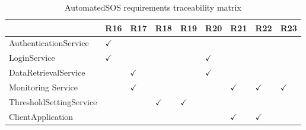 \begin{table}
\begin{adjustwidth}{-4cm}{}
\captionsetup{justification=centering}
\caption{AutomatedSOS requirements traceability matrix}
  \label{tab:table2}
\begin{tabular}{|l||l|l|l|l|l|l|l|l|}
\hline
\cellcolor[HTML]{EFEFEF}                      & \cellcolor[HTML]{EFEFEF} R16 & \cellcolor[HTML]{EFEFEF} R17 & \cellcolor[HTML]{EFEFEF} R18 & \cellcolor[HTML]{EFEFEF} R19 & \cellcolor[HTML]{EFEFEF} R20 & \cellcolor[HTML]{EFEFEF} R21 & \cellcolor[HTML]{EFEFEF} R22 & \cellcolor[HTML]{EFEFEF} R23 \\ \hline \hline
\cellcolor[HTML]{EFEFEF}AuthenticationService & $\checkmark$  &    &    &   &   &   &    &    \\ \hline
\cellcolor[HTML]{EFEFEF}LoginService     &  $\checkmark$  &       &   &    & $\checkmark$   &    &    &    \\ \hline
\cellcolor[HTML]{EFEFEF}DataRetrievalService         &    & $\checkmark$     &    &   &  $\checkmark$  &    &    &   \\ \hline
\cellcolor[HTML]{EFEFEF} Monitoring Service    &    &   $\checkmark$ &      &    &    &  $\checkmark$  & $\checkmark$  &  $\checkmark$  \\ \hline
\cellcolor[HTML]{EFEFEF} ThresholdSettingService  &    &       &  $\checkmark$  &  $\checkmark$  &    &    &    &    \\ \hline
\cellcolor[HTML]{EFEFEF} ClientApplication  &    &    &       &    &    &  $\checkmark$  &  $\checkmark$  &     \\ \hline
\end{tabular}
\end{adjustwidth}
\end{table}


